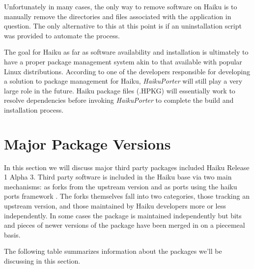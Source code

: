 \documentclass{article}
\begin{document}
Unfortunately in many cases, the only way to remove software on Haiku is to manually remove the directories and files associated with the application in question. The only alternative to this at this point is if an uninstallation script was provided to automate the process.\cite{AppInstallUninstall}

The goal for Haiku as far as software availability and installation is ultimately to have a proper package management system akin to that available with popular Linux distributions.\cite{HaikuFuturePkgMan} According to one of the developers responsible for developing a solution to package management for Haiku, \textit{HaikuPorter} will still play a very large role in the future. Haiku package files (.HPKG) will essentially work to resolve dependencies before invoking \textit{HaikuPorter} to complete the build and installation process.\cite{TappeOnPackages}

\section{Major Package Versions}

In this section we will discuss major third party packages included
Haiku Release 1 Alpha 3.  Third party software is included in the
Haiku base via two main mechanisms: as forks from the upstream version
and as ports using the haiku ports framework \cite{HaikuR1A3Src}.  The
forks themselves fall into two categories, those tracking an upstream
version, and those maintained by Haiku developers more or less
independently.  In some cases the package is maintained independently
but bits and pieces of newer versions of the package have been merged
in on a piecemeal basis.

The following table summarizes information about the packages we'll be
discussing in this section.
\end{document}
